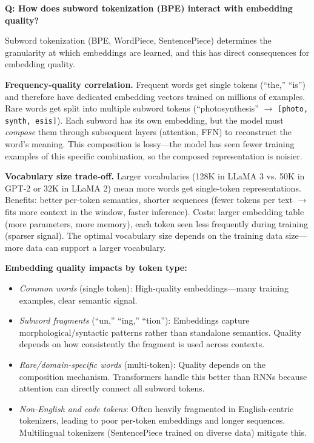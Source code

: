 \begin{interviewq}
\textbf{Q: How does subword tokenization (BPE) interact with embedding quality?}

 \quad {} \quad \badgefreq{\freqhigh}

\stronganswer

Subword tokenization (BPE, WordPiece, SentencePiece) determines the granularity at which embeddings are learned, and this has direct consequences for embedding quality.

\textbf{Frequency-quality correlation.} Frequent words get single tokens (``the,'' ``is'') and therefore have dedicated embedding vectors trained on millions of examples. Rare words get split into multiple subword tokens (``photosynthesis'' $\to$ \texttt{[photo, synth, esis]}). Each subword has its own embedding, but the model must \textit{compose} them through subsequent layers (attention, FFN) to reconstruct the word's meaning. This composition is lossy---the model has seen fewer training examples of this specific combination, so the composed representation is noisier.

\textbf{Vocabulary size trade-off.} Larger vocabularies (128K in LLaMA 3 vs. 50K in GPT-2 or 32K in LLaMA 2) mean more words get single-token representations. Benefits: better per-token semantics, shorter sequences (fewer tokens per text $\to$ fits more context in the window, faster inference). Costs: larger embedding table (more parameters, more memory), each token seen less frequently during training (sparser signal). The optimal vocabulary size depends on the training data size---more data can support a larger vocabulary.

\textbf{Embedding quality impacts by token type:}
\begin{itemize}
    \item \textit{Common words} (single token): High-quality embeddings---many training examples, clear semantic signal.
    \item \textit{Subword fragments} (``un,'' ``ing,'' ``tion''): Embeddings capture morphological/syntactic patterns rather than standalone semantics. Quality depends on how consistently the fragment is used across contexts.
    \item \textit{Rare/domain-specific words} (multi-token): Quality depends on the composition mechanism. Transformers handle this better than RNNs because attention can directly connect all subword tokens.
    \item \textit{Non-English and code tokens}: Often heavily fragmented in English-centric tokenizers, leading to poor per-token embeddings and longer sequences. Multilingual tokenizers (SentencePiece trained on diverse data) mitigate this.
\end{itemize}


\end{interviewq}
